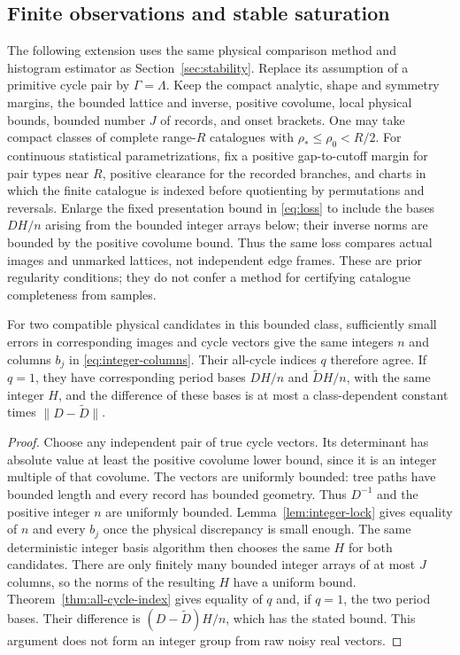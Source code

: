 \subsection{Finite observations and stable saturation}
The following extension uses the same physical comparison method and
histogram estimator as Section~\ref{sec:stability}. Replace its assumption
of a primitive cycle pair by $\Gamma=\Lambda$. Keep the compact analytic,
shape and symmetry margins, the bounded lattice and inverse, positive
covolume, local physical bounds, bounded number $J$ of records, and onset
brackets. One may take compact classes of complete range-$R$ catalogues
with $\rho_*\le\rho_0<R/2$. For continuous statistical parametrizations,
fix a positive gap-to-cutoff margin for pair types near $R$, positive
clearance for the recorded branches, and charts in which the finite
catalogue is indexed before quotienting by permutations and reversals.
Enlarge the fixed presentation bound in \eqref{eq:loss} to include the
bases $DH/n$ arising from the bounded integer arrays below; their inverse
norms are bounded by the positive covolume bound. Thus the same loss
compares actual images and unmarked lattices, not independent edge frames.
These are prior regularity conditions; they do not confer a method for
certifying catalogue completeness from samples.

\begin{lemma}\label{lem:stable-saturation}
For two compatible physical candidates in this bounded class, sufficiently
small errors in corresponding images and cycle vectors give the same
integers $n$ and columns $b_j$ in \eqref{eq:integer-columns}. Their
all-cycle indices $q$ therefore agree. If $q=1$, they have corresponding
period bases $DH/n$ and $\widetilde D H/n$, with the same integer $H$,
and the difference of these bases is at most a class-dependent constant
times $\|D-\widetilde D\|$.
\end{lemma}
\begin{proof}
Choose any independent pair of true cycle vectors. Its determinant has
absolute value at least the positive covolume lower bound, since it is
an integer multiple of that covolume. The vectors are uniformly bounded:
tree paths have bounded length and every record has bounded geometry.
Thus $D^{-1}$ and the positive integer $n$ are uniformly bounded.
Lemma~\ref{lem:integer-lock} gives equality of $n$ and every $b_j$ once
the physical discrepancy is small enough. The same deterministic
integer basis algorithm then chooses the same $H$ for both candidates.
There are only finitely many bounded integer arrays of at most $J$
columns, so the norms of the resulting $H$ have a uniform bound.
Theorem~\ref{thm:all-cycle-index} gives equality of $q$ and, if $q=1$,
the two period bases. Their difference is
$(D-\widetilde D)H/n$, which has the stated bound. This argument does
not form an integer group from raw noisy real vectors.
\end{proof}

